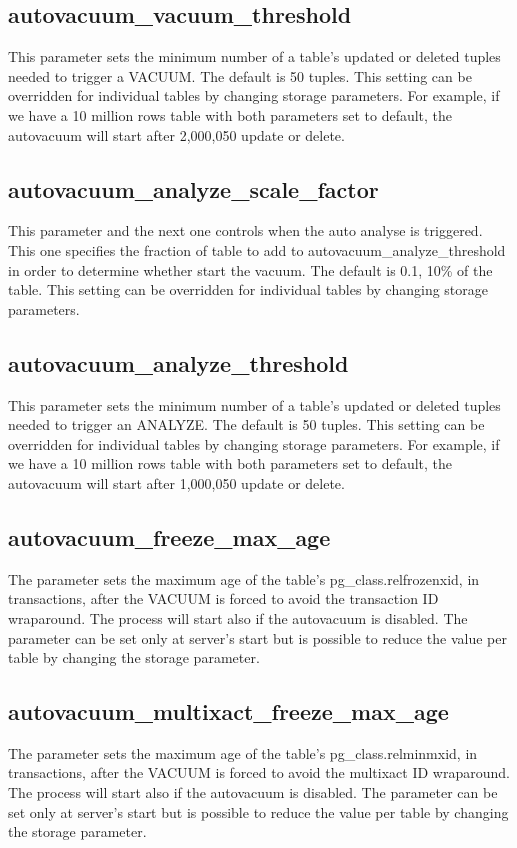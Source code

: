 \subsection{autovacuum\_vacuum\_threshold}
This parameter sets the minimum number of a table's updated or deleted tuples needed to trigger 
a VACUUM. The default is 50 tuples. This setting can be overridden for individual 
tables by changing storage parameters. For example, if we have a 10 million rows table with both 
parameters set to default, the autovacuum will start after 2,000,050 update or delete.

\subsection{autovacuum\_analyze\_scale\_factor}
This parameter and the next one controls when the auto analyse is triggered. This one specifies the 
fraction of table to add to autovacuum\_analyze\_threshold in order to determine whether start the 
vacuum. The default is 0.1,  10\% of the table. This setting can be overridden for individual 
tables by changing storage parameters.

\subsection{autovacuum\_analyze\_threshold}
This parameter sets the minimum number of a table's updated or deleted tuples needed to trigger an 
ANALYZE. The default is 50 tuples. This setting can be overridden for individual 
tables by changing storage parameters. For example, if we have a 10 million rows table with both 
parameters set to default, the autovacuum will start after 1,000,050 update or delete.

\subsection{autovacuum\_freeze\_max\_age}
The parameter sets the maximum age of the table's pg\_class.relfrozenxid, in transactions, after 
the VACUUM is forced to avoid the transaction ID wraparound. The process will start also if the 
autovacuum is disabled. The parameter can be set only at server's start but is possible to reduce 
the value per table by changing the storage parameter.

\subsection{autovacuum\_multixact\_freeze\_max\_age}
The parameter sets the maximum age of the table's pg\_class.relminmxid, in transactions, after 
the VACUUM is forced to avoid the multixact ID wraparound. The process will start also if the 
autovacuum is 
disabled. The parameter can be set only at server's start but is possible to reduce the value per 
table by changing the storage parameter.

